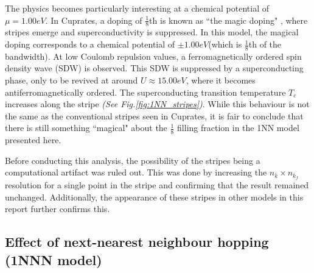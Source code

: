 \documentclass[12pt]{article}
\begin{document}
\noindent The physics becomes particularly interesting at a chemical potential of $\mu =1.00eV$. 
In Cuprates, a doping of $\frac{1}{8}$th is known as ``the magic doping" \cite{komiya2005magic}, where
stripes emerge and superconductivity is suppressed. In this model, the magical doping corresponds 
to a chemical potential of $\pm 1.00eV$(which is $\frac{1}{8}$th of the bandwidth). 
At low Coulomb repulsion values, a ferromagnetically ordered spin density wave (SDW) is observed. This SDW is suppressed by a superconducting phase,
only to be revived at around $U \approx 15.00eV$, where it becomes antiferromagnetically ordered. The superconducting transition temperature $T_c$ increases along the stripe \textit{(See Fig.\ref{fig:1NN_stripes})}.
While this behaviour is not the same as the conventional stripes seen in Cuprates, it is fair to conclude that there is still something 
``magical" about the $\frac{1}{8}$ filling fraction in the 1NN model presented here. \par
\medskip

\noindent Before conducting this analysis, the possibility of the stripes being a computational artifact was ruled out.
This was done by increasing the $n_k \times n_{k_f}$ resolution for a single point in the stripe and
confirming that the result remained unchanged. Additionally, the appearance of these stripes in other models in this report further confirms this.


\subsection{Effect of next-nearest neighbour hopping (1NNN model)}
\label{subsec:1NNNModel}
\end{document}

